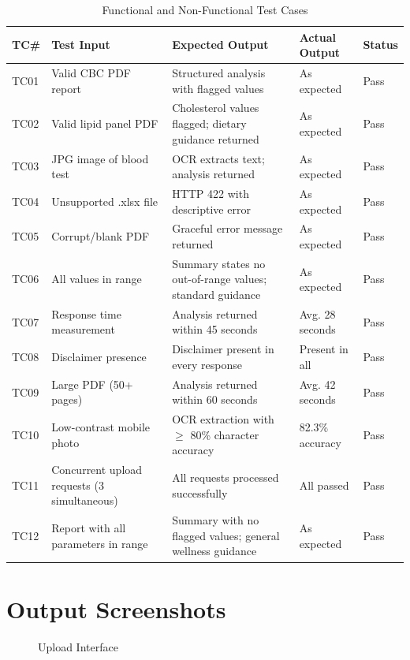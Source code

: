 \begin{table}[h]
\centering
\caption{Functional and Non-Functional Test Cases}
\begin{tabular}{|p{0.8cm}|p{2.8cm}|p{3cm}|p{2.5cm}|p{1.5cm}|}
    \hline
    \textbf{TC\#} & \textbf{Test Input} & \textbf{Expected Output} & \textbf{Actual Output} & \textbf{Status} \\
    \hline
    TC01 & Valid CBC PDF report & Structured analysis with flagged values & As expected & Pass \\
    TC02 & Valid lipid panel PDF & Cholesterol values flagged; dietary guidance returned & As expected & Pass \\
    TC03 & JPG image of blood test & OCR extracts text; analysis returned & As expected & Pass \\
    TC04 & Unsupported .xlsx file & HTTP 422 with descriptive error & As expected & Pass \\
    TC05 & Corrupt/blank PDF & Graceful error message returned & As expected & Pass \\
    TC06 & All values in range & Summary states no out-of-range values; standard guidance & As expected & Pass \\
    TC07 & Response time measurement & Analysis returned within 45 seconds & Avg. 28 seconds & Pass \\
    TC08 & Disclaimer presence & Disclaimer present in every response & Present in all & Pass \\
    TC09 & Large PDF (50+ pages) & Analysis returned within 60 seconds & Avg. 42 seconds & Pass \\
    TC10 & Low-contrast mobile photo & OCR extraction with $\geq$ 80\% character accuracy & 82.3\% accuracy & Pass \\
    TC11 & Concurrent upload requests (3 simultaneous) & All requests processed successfully & All passed & Pass \\
    TC12 & Report with all parameters in range & Summary with no flagged values; general wellness guidance & As expected & Pass \\
    \hline
\end{tabular}
\end{table}

\section{Output Screenshots}

\begin{figure}[h]
    \centering
    \caption{Upload Interface}
\end{figure}

